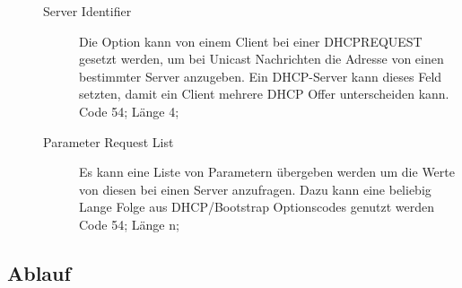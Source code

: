 \begin{description}
\begin{description}
\begin{itemize}
	\end{itemize}
	
	\item[Server Identifier] Die Option kann von einem Client bei einer DHCPREQUEST gesetzt werden, um bei Unicast Nachrichten die Adresse von einen bestimmter Server anzugeben. Ein DHCP-Server kann dieses Feld setzten, damit ein Client mehrere DHCP Offer unterscheiden kann. \\
	Code 54; Länge 4;
	
	
	\item[Parameter Request List] Es kann eine Liste von Parametern übergeben werden um die Werte von diesen bei einen Server anzufragen. Dazu kann eine beliebig Lange Folge aus DHCP/Bootstrap Optionscodes genutzt werden\\
	Code 54; Länge n;	
\end{description}
\end{description}
\subsection{Ablauf}

